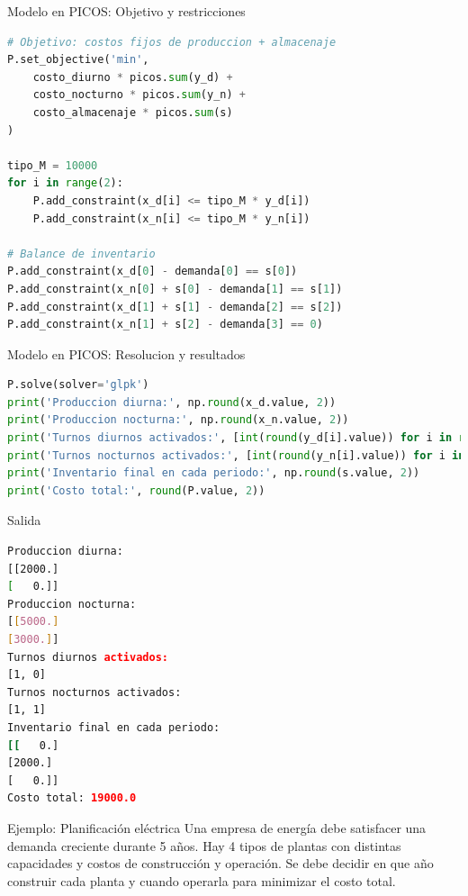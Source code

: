 \documentclass{beamer}
\begin{document}
\begin{frame}[fragile]{Modelo en PICOS: Objetivo y restricciones}
    \begin{lstlisting}[language=Python]
# Objetivo: costos fijos de produccion + almacenaje
P.set_objective('min',
    costo_diurno * picos.sum(y_d) +
    costo_nocturno * picos.sum(y_n) +
    costo_almacenaje * picos.sum(s)
)

tipo_M = 10000
for i in range(2):
    P.add_constraint(x_d[i] <= tipo_M * y_d[i])
    P.add_constraint(x_n[i] <= tipo_M * y_n[i])

# Balance de inventario
P.add_constraint(x_d[0] - demanda[0] == s[0])
P.add_constraint(x_n[0] + s[0] - demanda[1] == s[1])
P.add_constraint(x_d[1] + s[1] - demanda[2] == s[2])
P.add_constraint(x_n[1] + s[2] - demanda[3] == 0)
    \end{lstlisting}
\end{frame}

\begin{frame}[fragile]{Modelo en PICOS: Resolucion y resultados}
    \begin{lstlisting}[language=Python]
P.solve(solver='glpk')
print('Produccion diurna:', np.round(x_d.value, 2))
print('Produccion nocturna:', np.round(x_n.value, 2))
print('Turnos diurnos activados:', [int(round(y_d[i].value)) for i in range(2)])
print('Turnos nocturnos activados:', [int(round(y_n[i].value)) for i in range(2)])
print('Inventario final en cada periodo:', np.round(s.value, 2))
print('Costo total:', round(P.value, 2))
    \end{lstlisting}
\end{frame}

\begin{frame}[fragile]{Salida}
    \begin{lstlisting}[language=bash,backgroundcolor=\color{black},basicstyle=\color{white}\ttfamily,numbers=none]
Produccion diurna:
[[2000.]
[   0.]]
Produccion nocturna:
[[5000.]
[3000.]]
Turnos diurnos activados:
[1, 0]
Turnos nocturnos activados:
[1, 1]
Inventario final en cada periodo:
[[   0.]
[2000.]
[   0.]]
Costo total: 19000.0
    \end{lstlisting}
\end{frame}

\begin{frame}{Ejemplo: Planificación eléctrica}
    Una empresa de energía debe satisfacer una demanda creciente durante 5 años. Hay 4 tipos de plantas con distintas capacidades y costos de construcción y operación. Se debe decidir en que año construir cada planta y cuando operarla para minimizar el costo total.
\end{frame}
\end{document}
